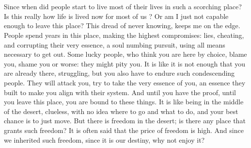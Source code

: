 \documentclass[12pt, a4paper]{article}
\begin{document}
\newpage
{}
\section*{\centering{}}
\vspace{0.5cm}

Since when did people start to live most of their lives in such a scorching place?
Is this really how life is lived now for most of us ? Or am I just not
capable enough to leave this place? This dread of never knowing, keeps me on the edge.
People spend years in this place,
making the highest compromises: lies, cheating, and corrupting their very essence, a soul
numbing pursuit, using all means necessary to get out. Some lucky
people, who think you are here by choice, blame you, shame you
or worse: they might pity you.
It is like it is not enough that you are already there, struggling, but you
also have to endure such condescending people. They will attack you, try to take the
very essence of you, an essence they built to make you align with 
their system. And until you have the proof, until you leave this place,
you are bound to these things.  It is like
being in the middle of the desert, clueless, with no idea where to go and what to do, and your best 
chance is to just move. But there is freedom in the desert; is there any place that grants such freedom?
It is often said that the price of freedom is high. And since we inherited such freedom, since it
is our destiny, why not enjoy it?



  
\end{document}

